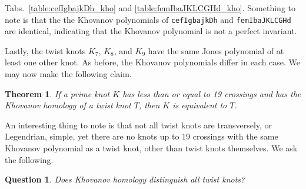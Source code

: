 \documentclass{article}
\theoremstyle{plain}
\newtheorem{theorem}{Theorem}
\newtheorem{question}{Question}
\begin{document}
        Tabs.~\ref{table:cefIgbajkDh_kho} and
        \ref{table:femIbaJKLCGHd_kho}. Something to note is that the
        the Khovanov polynomials of \texttt{cefIgbajkDh} and
        \texttt{femIbaJKLCGHd} are identical, indicating that the
        Khovanov polynomial is not a perfect invariant.
        \par\hfill\par
        Lastly, the twist knots $K_{7}$, $K_{8}$, and $K_{9}$ have the same
        Jones polynomial of at least one other knot. As before, the Khovanov
        polynomials differ in each case. We may now make the following claim.
        \begin{theorem}
            If a prime knot $K$ has less than or equal to 19 crossings and has
            the Khovanov homology of a twist knot $T$,
            then $K$ is equivalent to $T$.
        \end{theorem}
        An interesting thing to note is that not all twist knots are
        transversely, or Legendrian, simple, yet there are no knots up to
        19 crossings with the same Khovanov polynomial as a twist knot,
        other than twist knots themselves. We ask the following.
        \begin{question}
            Does Khovanov homology distinguish all twist knots?
        \end{question}
\end{document}
